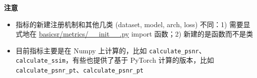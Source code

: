 \documentclass[../main.tex]{subfiles}
\begin{document}
\begin{note} %
    \textbf{注意}

    \begin{itemize}
        \item 指标的新建注册机制和其他几类 (dataset, model, arch, loss) 不同：1) 需要显式地在 \href{https://github.com/XPixelGroup/BasicSR/tree/master/basicsr/metrics/__init__.py}{basicsr/metrics/\_\_init\_\_.py} import 函数；2) 新建的是函数而不是类
        \item 目前指标主要是在 Numpy 上计算的，比如 \texttt{calculate\_psnr}、\texttt{calculate\_ssim}，有些也提供了基于 PyTorch 计算的版本，比如 \texttt{calculate\_psnr\_pt}、\texttt{calculate\_psnr\_pt}
    \end{itemize}
\end{note}
\end{document}
